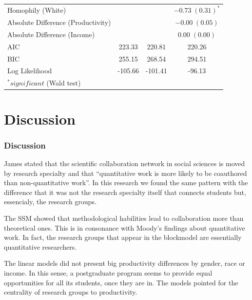\documentclass[compress]{beamer}
\begin{document}
\begin{frame}
\begin{table}[!h]
\begin{tabular}{l c c c }
				Homophily (White)         &                         &                     & $-0.73 \; (0.31)^{*}$   \\
				Absolute Difference (Productivity) &            &                         & $-0.00 \; (0.05)$       \\
				Absolute Difference (Income)       &            &                         & $0.00 \; (0.00)$        \\
				\hline
				AIC                   & 223.33                  & 220.81                  & 220.26                  \\
				BIC                   & 255.15                  & 268.54                  & 294.51                  \\
				Log Likelihood        & -105.66                 & -101.41                 & -96.13                  \\
				\hline
				\multicolumn{4}{l}{\scriptsize{$^*significant$ (Wald test)}}
			\end{tabular}
	\end{table}
\end{frame}


\section{Discussion}
\begin{frame}
	\frametitle{Discussion}
	
	\justify
	
	James  stated that the scientific collaboration network in social sciences is moved by research specialty and that ``quantitative work is more likely to be coauthored than non-quantitative work''. In this research we found the same pattern with the difference that it was not the research specialty itself that connects students but, essencialy, the research groups.
	
	\vspace{3mm}
	
	 The SSM showed that methodological habilities lead to collaboration more than theoretical ones. This is in consonance with Moody's findings about quantitative work. In fact, the research groups that appear in the blockmodel are essentially quantitative researchers.
	 
	 \vspace{3mm}
	 
	 The linear models did not present big productivity differences by gender, race or income. In this sense, a postgraduate program seems to provide equal opportunities for all its students, once they are in. The models pointed for the centrality of research groups to productivity.
\end{frame}
\end{document}
